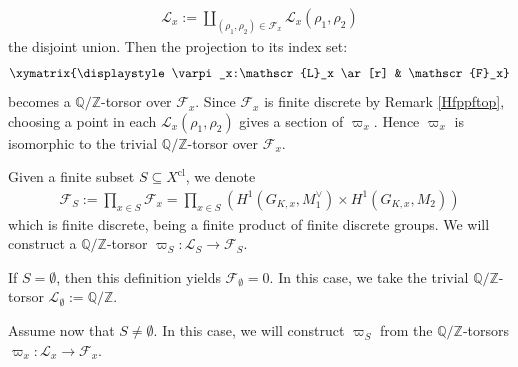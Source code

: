 \documentclass[a4paper]{amsart}
\theoremstyle{definition}
\numberwithin{equation}{section}
\begin{document}
\begin{align*}
    \mathscr{L}_x:=\coprod_{(\rho_1,\rho_2)\in\mathscr{F}_x}\mathscr{L}_x(\rho_1,\rho_2)
\end{align*}
the disjoint union. Then the projection to its index set:
\begin{align*}
    \xymatrix{\displaystyle\varpi_x:\mathscr{L}_x \ar[r] & \mathscr{F}_x}
\end{align*}
becomes a $\mathbb{Q}/\mathbb{Z}$-torsor over $\mathscr{F}_x$. Since $\mathscr{F}_x$ is finite discrete by Remark \ref{Hfppftop}, choosing a point in each $\mathscr{L}_x(\rho_1,\rho_2)$ gives a section of $\varpi_x$. Hence $\varpi_x$ is isomorphic to the trivial $\mathbb{Q}/\mathbb{Z}$-torsor over $\mathscr{F}_x$.


Given a finite subset $S\subseteq X^\mathrm{cl}$, we denote
\begin{align*}
    \mathscr{F}_S:=\prod_{x\in S}\mathscr{F}_x=\prod_{x\in S}\left(H^1(G_{K,x},M_1^\vee)\times H^1(G_{K,x},M_2)\right)
\end{align*}
which is finite discrete, being a finite product of finite discrete groups. We will construct a $\mathbb{Q}/\mathbb{Z}$-torsor $\varpi_S:\mathscr{L}_S\rightarrow\mathscr{F}_S$.

If $S=\emptyset$, then this definition yields $\mathscr{F}_\emptyset=0$. In this case, we take the trivial $\mathbb{Q}/\mathbb{Z}$-torsor $\mathscr{L}_\emptyset:=\mathbb{Q}/\mathbb{Z}$.

Assume now that $S\neq\emptyset$. In this case, we will construct $\varpi_S$ from the $\mathbb{Q}/\mathbb{Z}$-torsors $\varpi_x:\mathscr{L}_x\rightarrow\mathscr{F}_x$.
\end{document}
